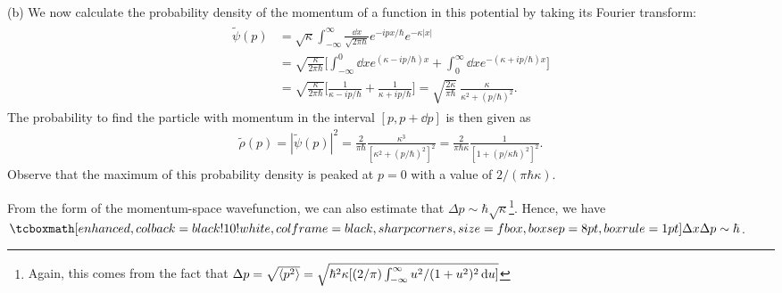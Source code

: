 {(b) We now calculate the probability density of the momentum of a function in this potential by taking its Fourier transform:
\begin{eqnarray}
    \begin{aligned}
        \tilde{\psi}(p) &= \sqrt{\kappa} \int_{-\infty}^{\infty} \frac{\dd{x}}{\sqrt{2 \pi \hbar}} e^{-i p x / \hbar} e^{-\kappa |x|} \\
                        &= \sqrt{\frac{\kappa}{2 \pi \hbar}} \Big[ \int_{-\infty}^{0} \dd{x} e^{(\kappa - i p / \hbar) x} + \int_{0}^{\infty} \dd{x} e^{-( \kappa + ip / \hbar ) x} \Big] \\
                        &= \sqrt{\frac{\kappa}{2 \pi \hbar}} \Big[ \frac{1}{\kappa - ip/\hbar} + \frac{1}{\kappa + ip/\hbar} \Big] = \sqrt{\frac{2 \kappa}{\pi \hbar}} ~ \frac{\kappa}{\kappa^2 + (p / \hbar)^2}
    .\end{aligned}
\end{eqnarray}
The probability to find the particle with momentum in the interval $[p,p+\dd{p}]$ is then given as
\begin{eqnarray}
    \tilde{\rho}(p) = |\tilde{\psi}(p)|^2 = \frac{2}{\pi \hbar} \frac{\kappa^3}{[\kappa^2 + (p/\hbar)^2]^2} = \frac{2}{\pi \hbar \kappa} \frac{1}{[1 + (p/\kappa \hbar)^2]^2}
.\end{eqnarray}
Observe that the maximum of this probability density is peaked at $p = 0$ with a value of $2/(\pi \hbar \kappa)$.

From the form of the momentum-space wavefunction, we can also estimate that $\Delta p \sim \hbar \sqrt{\kappa}$\footnote{Again, this comes from the fact that $\Delta p = \sqrt{\expval{p^2}} = \sqrt{\hbar^2 \kappa [ (2/\pi)\int_{-\infty}^{\infty} u^2/(1 + u^2)^2 \dd{u} ]}$}.
Hence, we have $\eqbox{ \Delta x \Delta p \sim \hbar }$.

}



